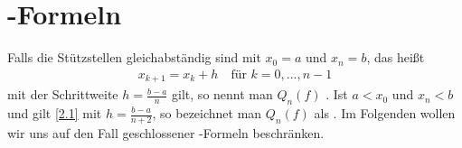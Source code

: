 \section{-Formeln}

Falls die Stützstellen gleichabständig sind mit $x_0=a$ und $x_n=b$, das heißt
\begin{align}
	\label{2.1}
	x_{k+1}=x_k+h\quad\text{für } k=0,...,n-1
\end{align}
mit der Schrittweite $h=\frac{b-a}{n}$ gilt, so nennt man $Q_n(f)$ . Ist $a<x_0$ und $x_n<b$ und gilt \cref{2.1} mit $h=\frac{b-a}{n+2}$, so bezeichnet man $Q_n(f)$ als . Im Folgenden wollen wir uns auf den Fall geschlossener -Formeln beschränken.